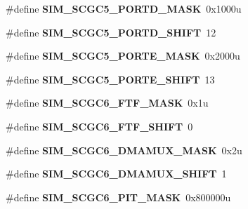 \begin{DoxyCompactItemize}
\#define {\bfseries S\+I\+M\+\_\+\+S\+C\+G\+C5\+\_\+\+P\+O\+R\+T\+D\+\_\+\+M\+A\+SK}~0x1000u
\item 
\mbox{\label{group___s_i_m___register___masks_gad5f267781fcedf0fcdc0c4d3607c10cb}} 
\#define {\bfseries S\+I\+M\+\_\+\+S\+C\+G\+C5\+\_\+\+P\+O\+R\+T\+D\+\_\+\+S\+H\+I\+FT}~12
\item 
\mbox{\label{group___s_i_m___register___masks_ga3d5e3e51d345fe424a4f24aa9ae73dc1}} 
\#define {\bfseries S\+I\+M\+\_\+\+S\+C\+G\+C5\+\_\+\+P\+O\+R\+T\+E\+\_\+\+M\+A\+SK}~0x2000u
\item 
\mbox{\label{group___s_i_m___register___masks_gae717813cf38c35e5e4ea4243e939b4bc}} 
\#define {\bfseries S\+I\+M\+\_\+\+S\+C\+G\+C5\+\_\+\+P\+O\+R\+T\+E\+\_\+\+S\+H\+I\+FT}~13
\item 
\mbox{\label{group___s_i_m___register___masks_ga949452096cb8609fdb3503dda3f9f729}} 
\#define {\bfseries S\+I\+M\+\_\+\+S\+C\+G\+C6\+\_\+\+F\+T\+F\+\_\+\+M\+A\+SK}~0x1u
\item 
\mbox{\label{group___s_i_m___register___masks_gaf767cc087ed5983b84e79996586efb12}} 
\#define {\bfseries S\+I\+M\+\_\+\+S\+C\+G\+C6\+\_\+\+F\+T\+F\+\_\+\+S\+H\+I\+FT}~0
\item 
\mbox{\label{group___s_i_m___register___masks_ga10469a89e2c48cd79e29fb73b0d06395}} 
\#define {\bfseries S\+I\+M\+\_\+\+S\+C\+G\+C6\+\_\+\+D\+M\+A\+M\+U\+X\+\_\+\+M\+A\+SK}~0x2u
\item 
\mbox{\label{group___s_i_m___register___masks_gaa69ac431213fb94ecd1d9ed2fa966e50}} 
\#define {\bfseries S\+I\+M\+\_\+\+S\+C\+G\+C6\+\_\+\+D\+M\+A\+M\+U\+X\+\_\+\+S\+H\+I\+FT}~1
\item 
\mbox{\label{group___s_i_m___register___masks_gaf5baabd241aba695593ce6369aa56ee2}} 
\#define {\bfseries S\+I\+M\+\_\+\+S\+C\+G\+C6\+\_\+\+P\+I\+T\+\_\+\+M\+A\+SK}~0x800000u
\item 
\mbox{\label{group___s_i_m___register___masks_ga2600ceb860eb353aa61abbecdbf5b6ae}} 

\end{DoxyCompactItemize}
